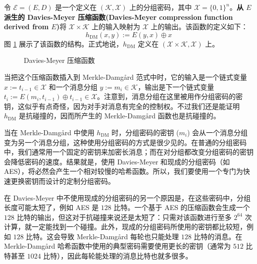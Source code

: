 令 $\mathcal{E}=(E,D)$ 是一个定义在 $(\mathcal{K},\mathcal{X})$ 上的分组密码，其中 $\mathcal{X}=\{0,1\}^n$。\textbf{从 $E$ 派生的 Davies-Meyer 压缩函数(Davies-Meyer compression function derived from $E$)}将 $\mathcal{X}\times\mathcal{K}$ 上的输入映射为 $\mathcal{X}$ 上的输出。该函数的定义如下：
\[
h_\mathrm{DM}(x,y):=E(y,x)\oplus x
\]
图 \ref{fig:8-6} 展示了该函数的结构。正式地说，$h_\mathrm{DM}$ 定义在 $(\mathcal{X}\times\mathcal{K},\mathcal{X})$ 上。

\begin{figure}
	\centering
	
	\caption{Davies-Meyer 压缩函数}
	\label{fig:8-6}
\end{figure}

当把这个压缩函数插入到 Merkle-Damg{\aa}rd 范式中时，它的输入是一个链式变量 $x:=t_{i-1}\in\mathcal{X}$ 和一个消息分组 $y:=m_i\in\mathcal{K}$，输出是下一个链式变量 $t_i:=E(m_i,t_{i-1})\oplus t_{i-1}\in\mathcal{X}$。注意到，消息分组在这里被用作分组密码的密钥，这似乎有点奇怪，因为对手对消息有完全的控制权。不过我们还是能证明 $h_\mathrm{DM}$ 是抗碰撞的，因而所产生的 Merkle-Damg{\aa}rd 函数也是抗碰撞的。

当在 Merkle-Damg{\aa}rd 中使用 $h_\mathrm{DM}$ 时，分组密码的密钥 ($m_i$) 会从一个消息分组变为另一个消息分组，这种使用分组密码的方式是很少见的。在普通的分组密码中，我们通常用一个固定的密钥来加密长消息；而在对分组都改变分组密码的密钥会降低密码的速度。结果就是，使用 Davies-Meyer 和现成的分组密码（如 AES），将必然会产生一个相对较慢的哈希函数。所以，我们要使用一个专门为快速更换密钥而设计的定制分组密码。

在 Davies-Meyer 中不使用现成的分组密码的另一个原因是，在这些密码中，分组长度可能太短了，例如 AES 是 $128$ 比特。一个基于 AES 的压缩函数会生成一个 $128$ 比特的输出，但这对于抗碰撞来说还是太短了：只需对该函数进行至多 $2^{64}$ 次计算，就一定能找到一个碰撞。此外，现成的分组密码所使用的密钥都比较短，例如 $128$ 比特。这会导致 Merkle-Damg{\aa}rd 每轮也只能处理 $128$ 比特的消息。在 Merkle-Damg{\aa}rd 哈希函数中使用的典型密码需要使用更长的密钥（通常为 $512$ 比特甚至 $1024$ 比特），因此每轮能处理的消息比特也就多很多。

